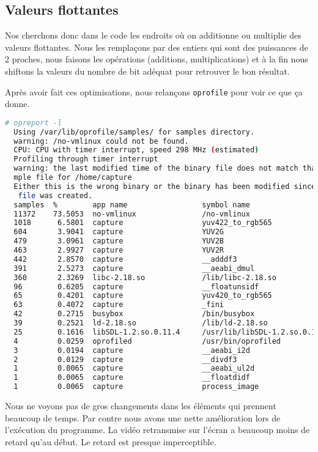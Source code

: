 \subsection{Valeurs flottantes}

Nos cherchons donc dans le code les endroits où on additionne ou multiplie des valeurs flottantes. Nous les remplaçons par des entiers qui sont des puissances de 2 proches, nous faisons les opérations (additions, multiplications) et à la fin nous shiftons la valeurs du nombre de bit adéquat pour retrouver le bon résultat.


\noindent Après avoir fait ces optimisations, nous relançons \texttt{oprofile} pour voir ce que ça donne.


\begin{lstlisting}[language=bash]
  # opreport -l
  Using /var/lib/oprofile/samples/ for samples directory.
  warning: /no-vmlinux could not be found.
  CPU: CPU with timer interrupt, speed 298 MHz (estimated)
  Profiling through timer interrupt
  warning: the last modified time of the binary file does not match that of the sa
  mple file for /home/capture
  Either this is the wrong binary or the binary has been modified since the sample
   file was created.
  samples  %        app name                 symbol name
  11372    73.5053  no-vmlinux               /no-vmlinux
  1018      6.5801  capture                  yuv422_to_rgb565
  604       3.9041  capture                  YUV2G
  479       3.0961  capture                  YUV2B
  463       2.9927  capture                  YUV2R
  442       2.8570  capture                  __adddf3
  391       2.5273  capture                  __aeabi_dmul
  360       2.3269  libc-2.18.so             /lib/libc-2.18.so
  96        0.6205  capture                  __floatunsidf
  65        0.4201  capture                  yuv420_to_rgb565
  63        0.4072  capture                  _fini
  42        0.2715  busybox                  /bin/busybox
  39        0.2521  ld-2.18.so               /lib/ld-2.18.so
  25        0.1616  libSDL-1.2.so.0.11.4     /usr/lib/libSDL-1.2.so.0.11.4
  4         0.0259  oprofiled                /usr/bin/oprofiled
  3         0.0194  capture                  __aeabi_i2d
  2         0.0129  capture                  __divdf3
  1         0.0065  capture                  __aeabi_ul2d
  1         0.0065  capture                  __floatdidf
  1         0.0065  capture                  process_image
\end{lstlisting}

Nous ne voyons pas de gros changements dans les éléments qui prennent beaucoup de temps. Par contre nous avons une nette amélioration lors de l'exécution du programme. La vidéo retransmise sur l'écran a beaucoup moins de retard qu'au début. Le retard est presque imperceptible.


